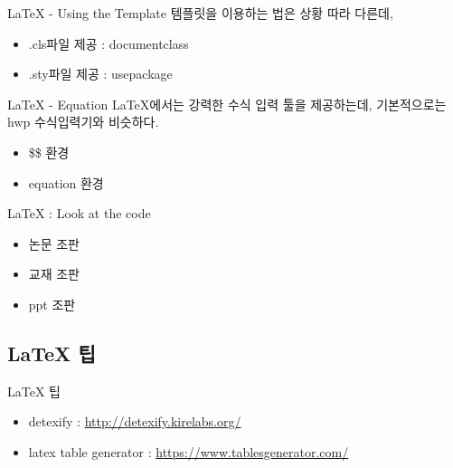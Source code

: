 \documentclass{beamer}
\begin{document}
\begin{frame}{LaTeX - Using the Template} 
템플릿을 이용하는 법은 상황 따라 다른데, 
\begin{itemize} 
\item .cls파일 제공 : documentclass
\item .sty파일 제공 : usepackage
\end{itemize}
\end{frame} 

\begin{frame}{LaTeX - Equation} 
LaTeX에서는 강력한 수식 입력 툴을 제공하는데, 기본적으로는 hwp 수식입력기와 비슷하다. 
\begin{itemize} 
\item \$\$ 환경 
\item equation 환경 
\end{itemize}
\end{frame} 



\begin{frame}{LaTeX : Look at the code} 
\begin{itemize} 
\item 논문 조판 
\item 교재 조판 
\item ppt 조판 
\end{itemize}
\end{frame} 




\subsection{LaTeX 팁} 

\begin{frame}{LaTeX 팁}
\begin{itemize}
\item detexify : \href{http://detexify.kirelabs.org/}{http://detexify.kirelabs.org/}
\item latex table generator : \href{https://www.tablesgenerator.com/}{https://www.tablesgenerator.com/}
\end{itemize}
\end{frame}
\end{document}
